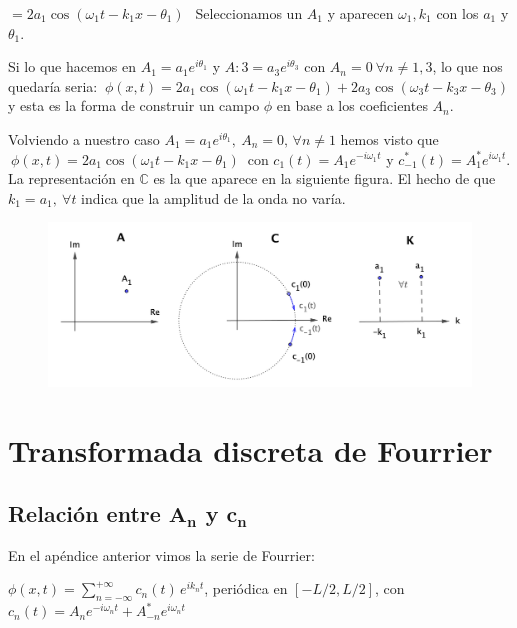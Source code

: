 $=2a_1 \cos (\omega_1 t-k_1 x -\theta_1)\ \ $ Seleccionamos un $A_1$ y aparecen $\omega_1, k_1$ con los $a_1$ y $\theta_1$.

Si lo que hacemos en $A_1=a_1e^{i\theta_1}$ y $A:3=a_3e^{i\theta_3}$ con $A_n=0 \ \forall n\neq 1,3$, lo que nos quedaría seria: $\ \phi(x,t)=2a_1 \cos (\omega_1 t-k_1 x -\theta_1)+2a_3 \cos (\omega_3 t-k_3 x -\theta_3)$ y esta es la forma de construir un campo $\phi$ en base a los coeficientes $A_n$.

Volviendo a nuestro caso  $A_1=a_1e^{i\theta_1},\ A_n=0,\, \forall n\neq 1$ hemos visto que  $\ \phi(x,t)=2a_1 \cos (\omega_1 t-k_1 x -\theta_1)\ $ con $c_1(t)=A_1e^{-i\omega_1 t}$ y $c_{-1}^*(t)=A_1^*e^{i\omega_1 t}$. La representación en $\mathbb C$ es la que aparece en la siguiente figura. El hecho de que $k_1=a_1,\ \forall t$ indica que la amplitud de la onda no varía.

 
\begin{figure}[H]
	\centering
	\includegraphics[width=.95\textwidth]{imagenes/apendices-01-13.png}
\end{figure}












\chapter{Transformada discreta de Fourrier}
\label{ap-DFT}

\section{Relación entre $\boldsymbol{A_n}$ y $\boldsymbol{c_n}$}

En el apéndice anterior vimos la serie de Fourrier:

$\displaystyle \phi(x,t)=\sum_{n=-\infty}^{+\infty} c_n(t)\, e^{ik_n t}$, periódica en $[-L/2,L/2]$, con $c_n(t)=A_ne^{-i\omega_n t}+A^*_{-n}e^{i\omega_n t}$

